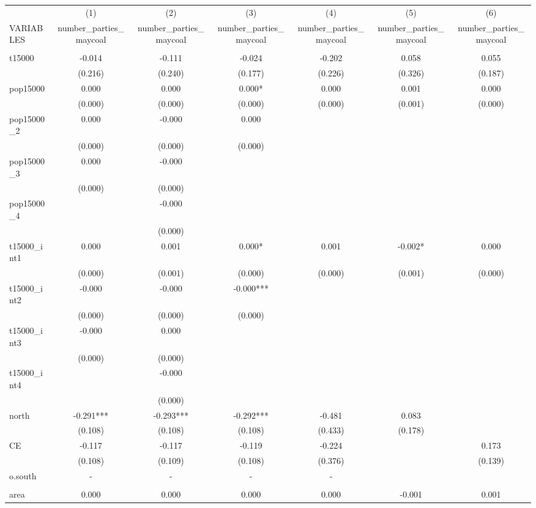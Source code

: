 \documentclass[]{article}
\begin{document}
\begin{tabular}{lcccccc} \hline
 & (1) & (2) & (3) & (4) & (5) & (6) \\
VARIABLES & number\_parties\_maycoal & number\_parties\_maycoal & number\_parties\_maycoal & number\_parties\_maycoal & number\_parties\_maycoal & number\_parties\_maycoal \\ \hline
 &  &  &  &  &  &  \\
t15000 & -0.014 & -0.111 & -0.024 & -0.202 & 0.058 & 0.055 \\
 & (0.216) & (0.240) & (0.177) & (0.226) & (0.326) & (0.187) \\
pop15000 & 0.000 & 0.000 & 0.000* & 0.000 & 0.001 & 0.000 \\
 & (0.000) & (0.000) & (0.000) & (0.000) & (0.001) & (0.000) \\
pop15000\_2 & 0.000 & -0.000 & 0.000 &  &  &  \\
 & (0.000) & (0.000) & (0.000) &  &  &  \\
pop15000\_3 & 0.000 & -0.000 &  &  &  &  \\
 & (0.000) & (0.000) &  &  &  &  \\
pop15000\_4 &  & -0.000 &  &  &  &  \\
 &  & (0.000) &  &  &  &  \\
t15000\_int1 & 0.000 & 0.001 & 0.000* & 0.001 & -0.002* & 0.000 \\
 & (0.000) & (0.001) & (0.000) & (0.000) & (0.001) & (0.000) \\
t15000\_int2 & -0.000 & -0.000 & -0.000*** &  &  &  \\
 & (0.000) & (0.000) & (0.000) &  &  &  \\
t15000\_int3 & -0.000 & 0.000 &  &  &  &  \\
 & (0.000) & (0.000) &  &  &  &  \\
t15000\_int4 &  & -0.000 &  &  &  &  \\
 &  & (0.000) &  &  &  &  \\
north & -0.291*** & -0.293*** & -0.292*** & -0.481 & 0.083 &  \\
 & (0.108) & (0.108) & (0.108) & (0.433) & (0.178) &  \\
CE & -0.117 & -0.117 & -0.119 & -0.224 &  & 0.173 \\
 & (0.108) & (0.109) & (0.108) & (0.376) &  & (0.139) \\
o.south & - & - & - & - &  &  \\
 &  &  &  &  &  &  \\
area & 0.000 & 0.000 & 0.000 & 0.000 & -0.001 & 0.001 \\

\end{tabular}
\end{document}
